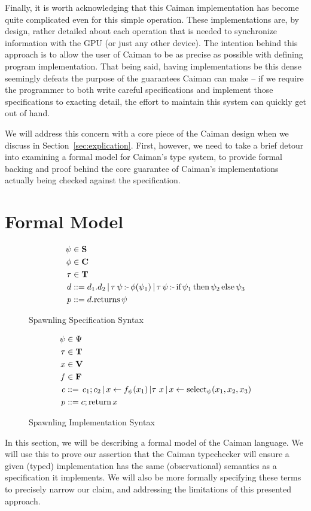 Finally, it is worth acknowledging that this Caiman implementation has become quite complicated even for this simple operation.  These implementations are, by design, rather detailed about each operation that is needed to synchronize information with the GPU (or just any other device).  The intention behind this approach is to allow the user of Caiman to be as precise as possible with defining program implementation.  That being said, having implementations be this dense seemingly defeats the purpose of the guarantees Caiman can make -- if we require the programmer to both write careful specifications and implement those specifications to exacting detail, the effort to maintain this system can quickly get out of hand.

We will address this concern with a core piece of the Caiman design when we discuss in Section~\ref{sec:explication}.  First, however, we need to take a brief detour into examining a formal model for Caiman's type system, to provide formal backing and proof behind the core guarantee of Caiman's implementations actually being checked against the specification.

\section{Formal Model}
\label{sec:formal}

\begin{figure}
\begin{align*}
	\psi &\in \textbf{S}\\
	\phi &\in \textbf{C}\\
	\tau &\in \textbf{T} \\
    d &\mathrel{::=} d_1.d_2 \,|\,
        \tau\,\psi\,\textrm{:-}\, \phi(\psi_1) \,|\,
        \tau\,\psi\,\textrm{:-}\, \textrm{if}\, \psi_1 \,\textrm{then}\, \psi_2 \,\textrm{else}\, \psi_3 
        \\
    p &\mathrel{::=} d.\textrm{returns}\, \psi
\end{align*}
\caption{Spawnling Specification Syntax}
\label{fig:spawnspecsyntax}
\end{figure}

\begin{figure}
\begin{align*}
	\psi&\in \Psi\\
   	\tau&\in \textbf{T} \\
	x&\in \textbf{V}\\
	f&\in \textbf{F}\\
	c&\mathrel{::=} \,c_1 ; c_2 \,|\, 
        x\leftarrow f_\psi(x_1) \,| \tau\ x \,|\, x\leftarrow\textrm{select}_{\psi} (x_1, x_2, x_3)\\
    p&\mathrel{::=} c;\textrm{return}\, x
\end{align*}
\caption{Spawnling Implementation Syntax}
\label{fig:spawnimplsyntax}
\end{figure}
In this section, we will be describing a formal model of the Caiman language. We will use this to prove our assertion that the Caiman typechecker will ensure a given (typed) implementation has the same (observational) semantics as a specification it implements.  We will also be more formally specifying these terms to precisely narrow our claim, and addressing the limitations of this presented approach.

